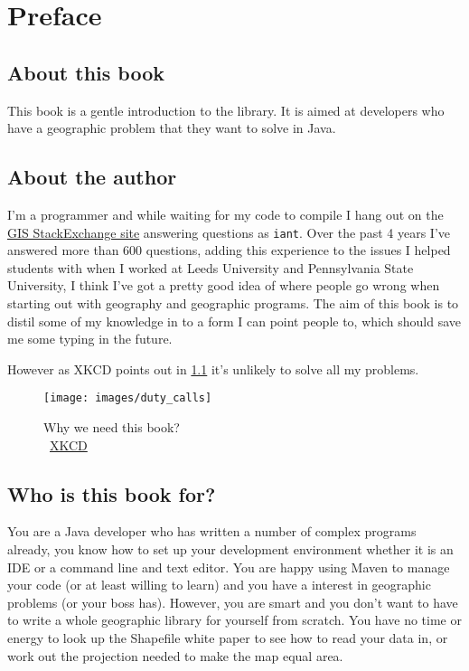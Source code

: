 \chapter{Preface}
\section{About this book}
This book is a gentle introduction to the \GeoTools library. It is aimed at developers who have a geographic problem that they want to solve in Java. 

\section{About the author}
I'm a programmer and while waiting for my code to compile I hang out on the \href{http://gis.stackexchange.com/}{GIS StackExchange site} answering questions as \texttt{iant}. Over the past 4 years I've answered more than 600 questions, adding this experience to the issues I helped students with when I worked at Leeds University and Pennsylvania State University, I think I've got a pretty good idea of where people go wrong when starting out with geography and geographic programs. The aim of this book is to distil some of my knowledge in to a form I can point people to, which should save me some typing in the future. 

However as XKCD points out in \cref{xkcd-duty} it's unlikely to solve all my problems. 


\begin{figure}[htbp]
{\centering
\texttt{[image: images/duty\_calls]}
\caption{Why we need this book?\\ \ccbync~\href{http://xkcd.com/386/}{XKCD}}
\label{xkcd-duty}
}
\end{figure}

\section{Who is this book for?}
You are a Java developer who has written a number of complex programs already, you know how to set up your development environment whether it is an \ac{IDE} or a command line and text editor. You are happy using Maven to manage your code (or at least willing to learn) and you have a interest in geographic problems (or your boss has). However, you are smart and you don't want to have to write a whole geographic library for yourself from scratch. You have no time or energy to look up the Shapefile white paper \citep{ESRI1997} to see how to read your data in, or work out the projection needed to make the map equal area. 

